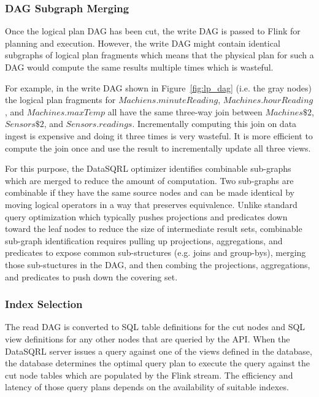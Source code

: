 \documentclass[	DIV=calc,%
							paper=letter,%
							fontsize=11pt,%
							twocolumn]{scrartcl}	 					%
\begin{document}
\subsubsection{DAG Subgraph Merging}

Once the logical plan DAG has been cut, the write DAG is passed to Flink for planning and execution. However, the write DAG might contain identical subgraphs of logical plan fragments which means that the physical plan for such a DAG would compute the same results multiple times which is wasteful.

For example, in the write DAG shown in Figure~\ref{fig:lp_dag} (i.e. the gray nodes) the logical plan fragments for $Machiens.minuteReading$, $Machines.hourReading$, and $Machines.maxTemp$ all have the same three-way join between $Machines\$2$, $Sensors\$2$, and $Sensors.readings$. Incrementally computing this join on data ingest is expensive and doing it three times is very wasteful. It is more efficient to compute the join once and use the result to incrementally update all three views.

For this purpose, the DataSQRL optimizer identifies combinable sub-graphs which are merged to reduce the amount of computation. Two sub-graphs are combinable if they have the same source nodes and can be made identical by moving logical operators in a way that preserves equivalence. Unlike standard query optimization which typically pushes projections and predicates down toward the leaf nodes to reduce the size of intermediate result sets, combinable sub-graph identification requires pulling up projections, aggregations, and predicates to expose common sub-structures (e.g. joins and group-bys), merging those sub-stuctures in the DAG, and then combing the projections, aggregations, and predicates to push down the covering set.

\subsubsection{Index Selection}

The read DAG is converted to SQL table definitions for the cut nodes and SQL view definitions for any other nodes that are queried by the API. When the DataSQRL server issues a query against one of the views defined in the database, the database determines the optimal query plan to execute the query against the cut node tables which are populated by the Flink stream. The efficiency and latency of those query plans depends on the availability of suitable indexes.
\end{document}
